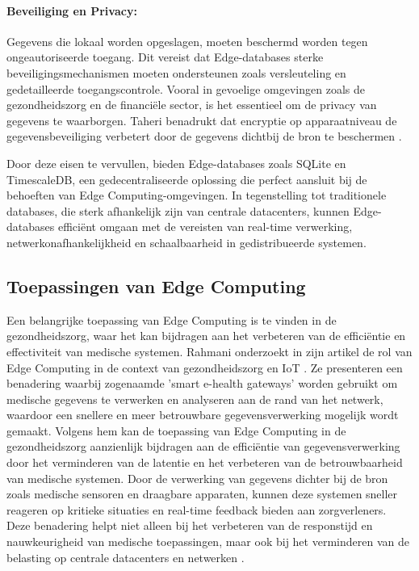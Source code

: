 \paragraph{Beveiliging en Privacy:}
   Gegevens die lokaal worden opgeslagen, moeten beschermd worden tegen ongeautoriseerde toegang. Dit vereist dat Edge-databases sterke beveiligingsmechanismen moeten ondersteunen zoals versleuteling en gedetailleerde toegangscontrole. Vooral in gevoelige omgevingen zoals de gezondheidszorg en de financiële sector, is het essentieel om de privacy van gegevens te waarborgen. Taheri benadrukt dat encryptie op apparaatniveau de gegevensbeveiliging verbetert door de gegevens dichtbij de bron te beschermen \autocite{Taheri2020}.

Door deze eisen te vervullen, bieden Edge-databases zoals SQLite en TimescaleDB, een gedecentraliseerde oplossing die perfect aansluit bij de behoeften van Edge Computing-omgevingen. In tegenstelling tot traditionele databases, die sterk afhankelijk zijn van centrale datacenters, kunnen Edge-databases efficiënt omgaan met de vereisten van real-time verwerking, netwerkonafhankelijkheid en schaalbaarheid in gedistribueerde systemen.


\subsection{Toepassingen van Edge Computing}

Een belangrijke toepassing van Edge Computing is te vinden in de gezondheidszorg, waar het kan bijdragen aan het verbeteren van de efficiëntie en effectiviteit van medische systemen. Rahmani onderzoekt in zijn artikel de rol van Edge Computing in de context van gezondheidszorg en IoT \autocite{Rahmani2018}.
 Ze presenteren een benadering waarbij zogenaamde 'smart e-health gateways' worden gebruikt om medische gegevens te verwerken en analyseren aan de rand van het netwerk, waardoor een snellere en meer betrouwbare gegevensverwerking mogelijk wordt gemaakt.
Volgens hem kan de toepassing van Edge Computing in de gezondheidszorg aanzienlijk bijdragen aan de efficiëntie van gegevensverwerking door het verminderen van de latentie en het verbeteren van de betrouwbaarheid van medische systemen. 
 Door de verwerking van gegevens dichter bij de bron zoals medische sensoren en draagbare apparaten, kunnen deze systemen sneller reageren op kritieke situaties en real-time feedback bieden aan zorgverleners.
Deze benadering helpt niet alleen bij het verbeteren van de responstijd en nauwkeurigheid van medische toepassingen, maar ook bij het verminderen van de belasting op centrale datacenters en netwerken \autocite{Rahmani2018}.
 
